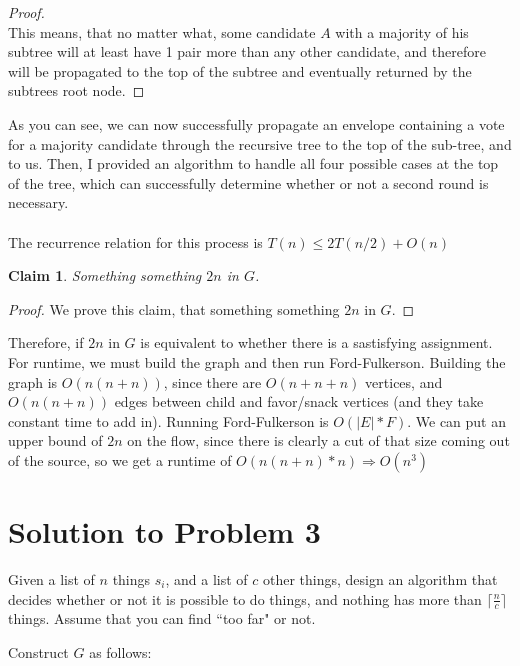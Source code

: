 \documentclass[11pt]{article}
\newtheorem{claim}[theorem]{Claim}
\begin{document}
\begin{proof}
\\
This means, that no matter what, some candidate $A$ with a majority of his subtree will at least have 1 pair more than any other candidate, and therefore will be propagated to the top of the subtree and eventually returned by the subtrees root  node.

\end{proof}

As you can see, we can now successfully propagate an envelope containing a vote for a majority candidate through the recursive tree to the top of the sub-tree, and to us. Then, I provided an algorithm to handle all four possible cases at the top of the tree, which can successfully determine whether or not a second round is necessary.\\
\\
The recurrence relation for this process is $T(n) \leq 2T(n/2) + O(n)$

\begin{claim} 
Something something $2n$ in $G$. 
\end{claim}
\begin{proof}
We prove this claim, that something something $2n$ in $G$.
\end{proof}
Therefore, if $2n$ in $G$ is equivalent to whether there is a sastisfying assignment. For runtime, we must build the graph and then run Ford-Fulkerson. Building the graph is $O(n(n+n))$, since there are $O(n+n+n)$ vertices, and $O(n(n+n))$ edges between child and favor/snack vertices (and they take constant time to add in). Running Ford-Fulkerson is $O(|E|*F)$. We can put an upper bound of $2n$ on the flow, since there is clearly a cut of that size coming out of the source, so we get a runtime of $O(n(n+n) * n) \Rightarrow O(n^{3})$

\newpage

\section*{Solution to Problem 3}



Given a list of $n$ things $s_i$, and a list of $c$ other things, design an algorithm that decides whether or not it is possible to do things, and nothing has more than $\lceil \frac{n}{c} \rceil$ things. Assume that you can find ``too far" or not.

Construct $G$ as follows:

\end{document}
